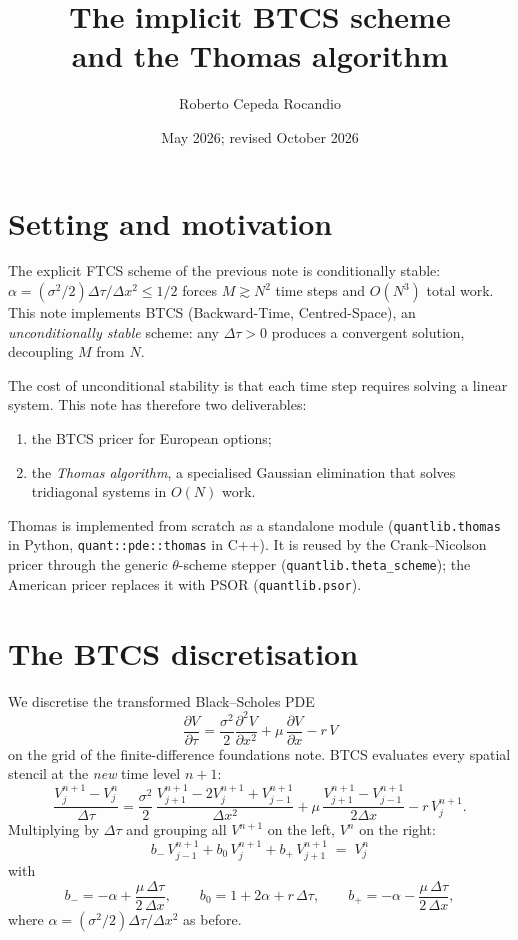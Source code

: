 \documentclass[11pt,a4paper]{article}
\title{The implicit BTCS scheme\\and the Thomas algorithm}
\author{Roberto Cepeda Rocandio}
\date{May 2026; revised October 2026}
\begin{document}
\maketitle

\section{Setting and motivation}

The explicit FTCS scheme of the previous note is conditionally
stable: $\alpha = (\sigma^2/2)\Delta\tau/\Delta x^2 \le 1/2$ forces
$M \gtrsim N^2$ time steps and $O(N^3)$ total work. This note
implements BTCS (Backward-Time, Centred-Space), an
\emph{unconditionally stable} scheme: any $\Delta\tau > 0$ produces a
convergent solution, decoupling $M$ from $N$.

The cost of unconditional stability is that each time step requires
solving a linear system. This note has therefore two deliverables:
\begin{enumerate}[leftmargin=2em]
\item the BTCS pricer for European options;
\item the \emph{Thomas algorithm}, a specialised Gaussian elimination
that solves tridiagonal systems in $O(N)$ work.
\end{enumerate}
Thomas is implemented from scratch as a standalone module
(\texttt{quantlib.thomas} in Python, \texttt{quant::pde::thomas} in
C++). It is reused by the Crank--Nicolson pricer through the generic
$\theta$-scheme stepper (\texttt{quantlib.theta\_scheme}); the American
pricer replaces it with PSOR (\texttt{quantlib.psor}).

\section{The BTCS discretisation}

We discretise the transformed Black--Scholes PDE
\begin{equation}
\frac{\partial V}{\partial \tau}
= \frac{\sigma^2}{2}\frac{\partial^2 V}{\partial x^2}
+ \mu\,\frac{\partial V}{\partial x}
- r\,V
\label{eq:transformed}
\end{equation}
on the grid of the finite-difference foundations note. BTCS evaluates every spatial stencil at the
\emph{new} time level $n+1$:
\[
\frac{V_j^{n+1} - V_j^n}{\Delta\tau}
= \frac{\sigma^2}{2}\,\frac{V_{j+1}^{n+1} - 2 V_j^{n+1} + V_{j-1}^{n+1}}{\Delta x^2}
+ \mu\,\frac{V_{j+1}^{n+1} - V_{j-1}^{n+1}}{2\Delta x}
- r\,V_j^{n+1}.
\]
Multiplying by $\Delta\tau$ and grouping all $V^{n+1}$ on the left,
$V^n$ on the right:
\begin{equation}
\boxed{\;
b_-\,V_{j-1}^{n+1} + b_0\,V_j^{n+1} + b_+\,V_{j+1}^{n+1}
\;=\; V_j^n
\;}
\label{eq:btcs}
\end{equation}
with
\[
b_- = -\alpha + \frac{\mu\,\Delta\tau}{2\,\Delta x},
\qquad
b_0 = 1 + 2\alpha + r\,\Delta\tau,
\qquad
b_+ = -\alpha - \frac{\mu\,\Delta\tau}{2\,\Delta x},
\]
where $\alpha = (\sigma^2/2)\Delta\tau/\Delta x^2$ as before.
\end{document}
